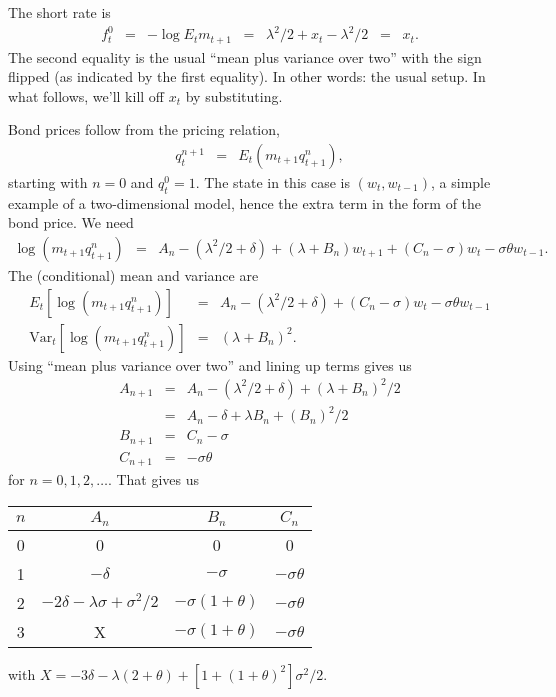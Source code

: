 \documentclass[11pt]{exam}
\begin{document}
\begin{questions}
\begin{solution}
\begin{parts}
\item The short rate is
\begin{eqnarray*}
    f^0_t &=& - \log E_t m_{t+1} \;\;=\;\;  \lambda^2/2 + x_t - \lambda^2/2
            \;\;=\;\; x_t .
\end{eqnarray*}
The second equality is the usual ``mean plus variance over two'' with the sign flipped
(as indicated by the first equality).
In other words:  the usual setup.
In what follows, we'll kill off $x_t$ by substituting.
\item
Bond prices follow from the pricing relation,
\begin{eqnarray*}
    q_t^{n+1} &=& E_t (m_{t+1} q_{t+1}^n) ,
\end{eqnarray*}
starting with $n=0$ and  $q^0_t = 1$.
The state in this case is $(w_t, w_{t-1})$, a simple example of a
two-dimensional model, hence the extra term in the form of the bond price.
We need
\begin{eqnarray*}
    \log (m_{t+1} q_{t+1}^n) &=&
            A_n - (\lambda^2/2 + \delta) + (\lambda+B_n) w_{t+1}
            + (C_n-\sigma) w_t - \sigma \theta w_{t-1} .
\end{eqnarray*}
The (conditional) mean and variance are
\begin{eqnarray*}
    E_t [ \log (m_{t+1} q_{t+1}^n)] &=&
            A_n - (\lambda^2/2 + \delta)
            + (C_n-\sigma) w_t - \sigma \theta w_{t-1} \\
    \mbox{Var}_t [\log (m_{t+1} q_{t+1}^n)] &=&
            (\lambda+B_n)^2 .
\end{eqnarray*}
Using ``mean plus variance over two'' and lining up terms gives us
\begin{eqnarray*}
        A_{n+1} &=& A_n - (\lambda^2/2 + \delta) + (\lambda+B_n)^2/2 \\
                &=& A_n - \delta + \lambda B_n + (B_n)^2/2 \\
        B_{n+1} &=& C_n - \sigma \\
        C_{n+1} &=& - \sigma \theta
\end{eqnarray*}
for $n=0,1,2,\ldots$.
That gives us
\begin{center}
\begin{tabular}{cccc}
        $n$  & $A_n$ & $B_n$ & $C_n$ \\
        \midrule
        0   &  0 & 0 & 0 \\
        1   &  $-\delta$ & $-\sigma$ & $-\sigma\theta$  \\
        2   &  $-2 \delta - \lambda\sigma + \sigma^2/2$   &  $-\sigma(1+\theta)$ & $-\sigma\theta$ \\
        3   &  X  &  $-\sigma(1+\theta)$ & $-\sigma\theta$
\end{tabular}
\end{center}
with
$X = - 3 \delta - \lambda (2+\theta)+ [1 + (1+\theta)^2] \sigma^2/2 $.


\end{parts}
\end{solution}
\end{questions}
\end{document}
